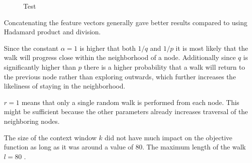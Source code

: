 \begin{figure}%
  \centering
\caption[short desc]{Test}%
\label{fig:hacketyhackhack}%
\end{figure}

Concatenating the feature vectors generally gave better results compared to using Hadamard product and division.

Since the constant $\alpha = 1$ is higher that both $1/q$ and $1/p$ it is most likely that the walk will progress close within the neighborhood of a node. Additionally since $q$ is significantly higher than $p$ there is a higher probability that a walk will return to the previous node rather than exploring outwards, which further increases the likeliness of staying in the neighborhood.

$r=1$ means that only a single random walk is performed from each node. This might be sufficient because the other parameters already increases traversal of the neighboring nodes.

The size of the context window $k$ did not have much impact on the objective function as long as it was around a value of 80. The maximum length of the walk $l=80$ .

